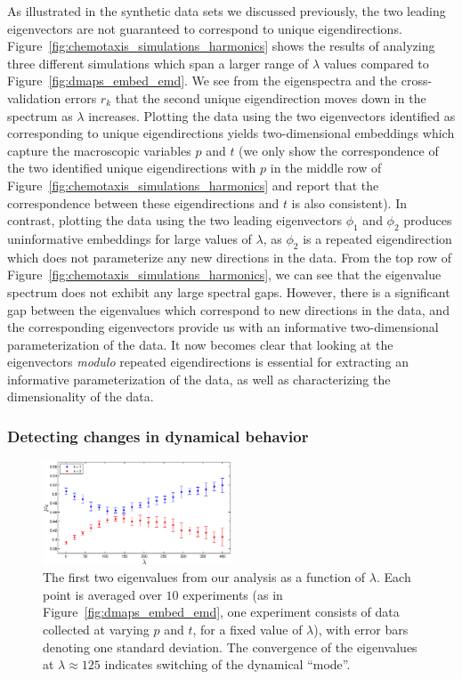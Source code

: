 \documentclass[preprint]{elsarticle}
\begin{document}
As illustrated in the synthetic data sets we discussed previously, the two leading eigenvectors are not guaranteed to correspond to unique eigendirections. 
%
Figure~\ref{fig:chemotaxis_simulations_harmonics} shows the results of analyzing three different simulations which span a larger range of $\lambda$ values compared to Figure~\ref{fig:dmaps_embed_emd}. 
%
We see from the eigenspectra and the cross-validation errors $r_k$ that the second unique eigendirection moves down in the spectrum as $\lambda$ increases. 
%
Plotting the data using the two eigenvectors identified as corresponding to unique eigendirections yields two-dimensional embeddings which capture the macroscopic variables $p$ and $t$ (we only show the correspondence of the two identified unique eigendirections with $p$ in the middle row of Figure~\ref{fig:chemotaxis_simulations_harmonics} and report that the correspondence between these eigendirections and $t$ is also consistent). 
%
In contrast, plotting the data using the two leading eigenvectors $\phi_1$ and $\phi_2$ produces uninformative embeddings for large values of $\lambda$, as $\phi_2$ is a repeated eigendirection which does not parameterize any new directions in the data.
%
From the top row of Figure~\ref{fig:chemotaxis_simulations_harmonics}, we can see that the eigenvalue spectrum does not exhibit any large spectral gaps.
%
However, there is a significant gap between the eigenvalues which correspond to new directions in the data, and the corresponding eigenvectors provide us with an informative two-dimensional parameterization of the data. %
%
It now becomes clear that looking at the eigenvectors {\em modulo} repeated eigendirections is essential for extracting an informative parameterization of the data, as well as characterizing the dimensionality of the data. 



\subsubsection{Detecting changes in dynamical behavior}


\begin{figure}[t] 
\centering
\includegraphics[width=0.5\textwidth]{detect_change_eigenvalues}
\caption{The first two eigenvalues from our analysis as a function of $\lambda$. Each point is averaged over $10$ experiments (as in Figure~\ref{fig:dmaps_embed_emd}, one experiment consists of data collected at varying $p$ and $t$, for a fixed value of $\lambda$), with error bars denoting one standard deviation. 
The convergence of the eigenvalues at $\lambda \approx 125$ indicates switching of the dynamical ``mode''.}
\label{fig:detect_change}
\end{figure}
\end{document}
